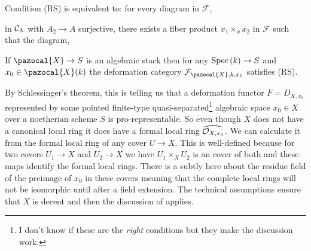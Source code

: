 \documentclass[12pt]{article}
\renewcommand{\X}{\pazocal{X}}
\renewcommand{\F}{\mathcal{F}}
\begin{document}
\begin{lemma}
Condition (RS) is equivalent to: for every diagram in $\F$,
\begin{center}
\quad {} \quad
{}
\end{center}
in $\mathcal{C}_\Lambda$ with $A_2 \to A$ surjective, there exists a fiber product $x_1 \times_x x_2$ in $\F$ such that the diagram,
\begin{center}
\quad {} \quad
{}
\end{center}
\end{lemma}

\begin{lemma}
If $\X \to S$ is an algebraic stack then for any $\mathrm{Spec}\left( k \right) \to S$ and $x_0 \in \X(k)$ the deformation category $\F_{\X, k, x_0}$ satisfies (RS). 
\end{lemma}

\begin{rmk}
By Schlessinger's theorem, this is telling us that a deformation functor $F = D_{X,x_0}$ represented by some pointed finite-type quasi-separated\footnote{I don't know if these are the \textit{right} conditions but they make the discussion work.} algebraic space $x_0 \in X$ over a noetherian scheme $S$ is pro-representable. So even though $X$ does not have a canonical local ring it does have a formal local ring $\widehat{\mathcal{O}_{X, x_0}}$. We can calculate it from the formal local ring of any \etale cover $U \to X$. This is well-defined because for two \etale covers $U_1 \to X$ and $U_2 \to X$ we have $U_1 \times_X U_2$ is an \etale cover of both and these maps identify the formal local rings. There is a subtly here about the residue field of the preimage of $x_0$ in these \etale covers meaning that the complete local rings will not be isomorphic until after a field extension. The technical assumptions ensure that $X$ is decent and then the discussion of  applies.
\end{rmk}
\end{document}
